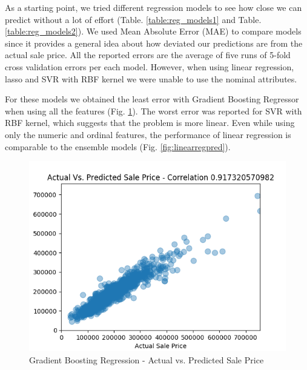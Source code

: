 \documentclass[conference,compsoc]{IEEEtran}
\begin{document}
As a starting point, we tried different regression models to see how close we can predict without a lot of effort (Table. \ref{table:reg_models1} and Table. \ref{table:reg_models2}). We used Mean Absolute Error (MAE) to compare models since it provides a general idea about how deviated our predictions are from the actual sale price. All the reported errors are the average of five runs of 5-fold cross validation errors per each model. However, when using linear regression, lasso and SVR with RBF kernel we were unable to use the nominal attributes.

\par
For these models we obtained the least error with Gradient Boosting Regressor when using all the features (Fig. \ref{fig:gradientboosting}). The worst error was reported for SVR with RBF kernel, which suggests that the problem is more linear. Even while using only the numeric and ordinal features, the performance of linear regression is comparable to the ensemble models (Fig. \ref{fig:linearregpred}).

\begin{figure}[!h]
  \includegraphics[width=\linewidth,natwidth=661,natheight=476]{Linear.png}
  \caption{Gradient Boosting Regression - Actual vs. Predicted Sale Price}
  \label{fig:gradientboosting}
\end{figure}
\end{document}
